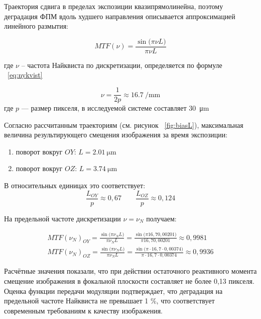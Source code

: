 Траектория сдвига в пределах экспозиции квазипрямолинейна, поэтому деградация ФПМ вдоль худшего направления описывается аппроксимацией линейного размытия:

\begin{equation}
	\label{eq:MTF_aprox}
  MTF(\nu) = \frac{\sin\!\bigl(\pi \nu L\bigr)}{\pi \nu L}
	\end{equation}

где \(\nu\) -- частота Найквиста по дискретизации, определяется по формуле ~\eqref{eq:nykvist}

\begin{equation}
	\label{eq:nykvist}
	\nu = \frac{1}{2p} \approx \SI{16.7}{\per\milli\meter}
\end{equation}
где \(p\) --- размер пикселя, в исследуемой системе составляет \SI{30}{\micro\meter}

Согласно рассчитанным траекториям (см. рисунок ~\ref{fig:biasL}), максимальная величина результирующего смещения изображения за время экспозиции:
\begin{enumerate}
	\item поворот вокруг $OY$: $L= \SI{2,01}{\micro\meter}$
	\item поворот вокруг $OZ$: $L= \SI{3,74}{\micro\meter}$
	\end{enumerate}
	
В относительных единицах это соответствует:
\begin{equation}
	\frac{L_{OY}}{p} \approx 0,67 \quad \quad \frac{L_{OZ}}{p} \approx 0,124
\end{equation}

На предельной частоте дискретизации $\nu = \nu_N$ получаем:

\begin{equation}
	\begin{split}
	\label{eq:MTF_result}
	MTF(\nu_N)_{OY}=\frac{\sin\!\bigl(\pi \nu_N L\bigr)}{\pi \nu_N L} =  \frac{\sin\!\bigl(\pi 16,7 0,00201 \bigr)}{\pi 16,7 0,00201} \approx  0,9981\\
	MTF(\nu_N)_{OZ}=\frac{\sin\!\bigl(\pi \nu_N L\bigr)}{\pi \nu_N L} =  \frac{\sin\!\bigl(\pi \cdot 16,7 \cdot 0,00374 \bigr)}{\pi \cdot 16,7 \cdot 0,00374} \approx 0,9936
	\end{split}
	\end{equation}

Расчётные значения показали, что при действии остаточного реактивного момента смещение изображения в фокальной плоскости составляет не более 0,13 пикселя. Оценка функции передачи модуляции подтверждает, что деградация на предельной частоте Найквиста не превышает 1 \%, что соответствует современным требованиям к качеству изображения.




